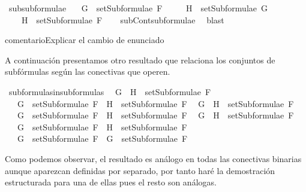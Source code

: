 \begin{isabellebody}
%
\endisadelimproof
\isanewline
{}\isamarkupfalse%
\ subsubformulae{\isacharcolon}\ \isanewline
\ \ {\isachardoublequoteopen}G\ {\isasymin}\ setSubformulae\ F\ \isanewline
\ \ \ {\isasymLongrightarrow}\ H\ {\isasymin}\ setSubformulae\ G\ \isanewline
\ \ \ {\isasymLongrightarrow}\ H\ {\isasymin}\ setSubformulae\ F{\isachardoublequoteclose}\isanewline
%
\isadelimproof
\ \ %
\endisadelimproof
%
\isatagproof
{}\isamarkupfalse%
\ subContsubformulae\ \isamarkupfalse%
\ blast%
\endisatagproof
{\isafoldproof}%
%
\isadelimproof
%
\endisadelimproof
%
\begin{isamarkuptext}%
comentario{Explicar el cambio de enunciado}%
\end{isamarkuptext}\isamarkuptrue%
%
\begin{isamarkuptext}%
A continuación presentamos otro resultado que relaciona los 
  conjuntos de subfórmulas según las conectivas que operen.%
\end{isamarkuptext}\isamarkuptrue%
\isamarkupfalse%
\ subformulas{\isacharunderscore}in{\isacharunderscore}subformulas{\isacharcolon}\isanewline
\ \ {\isachardoublequoteopen}G\ \isactrlbold {\isasymand}\ H\ {\isasymin}\ setSubformulae\ F\ \isanewline
\ \ {\isasymLongrightarrow}\ G\ {\isasymin}\ setSubformulae\ F\ {\isasymand}\ H\ {\isasymin}\ setSubformulae\ F{\isachardoublequoteclose}\isanewline
\ \ {\isachardoublequoteopen}G\ \isactrlbold {\isasymor}\ H\ {\isasymin}\ setSubformulae\ F\ \isanewline
\ \ {\isasymLongrightarrow}\ G\ {\isasymin}\ setSubformulae\ F\ {\isasymand}\ H\ {\isasymin}\ setSubformulae\ F{\isachardoublequoteclose}\isanewline
\ \ {\isachardoublequoteopen}G\ \isactrlbold {\isasymrightarrow}\ H\ {\isasymin}\ setSubformulae\ F\ \isanewline
\ \ {\isasymLongrightarrow}\ G\ {\isasymin}\ setSubformulae\ F\ {\isasymand}\ H\ {\isasymin}\ setSubformulae\ F{\isachardoublequoteclose}\isanewline
\ \ {\isachardoublequoteopen}\isactrlbold {\isasymnot}\ G\ {\isasymin}\ setSubformulae\ F\ {\isasymLongrightarrow}\ G\ {\isasymin}\ setSubformulae\ F{\isachardoublequoteclose}\isanewline
%
\isadelimproof
\ \ %
\endisadelimproof
%
\isatagproof
{}\isamarkupfalse%
%
\endisatagproof
{\isafoldproof}%
%
\isadelimproof
%
\endisadelimproof
%
\begin{isamarkuptext}%
Como podemos observar, el resultado es análogo en todas las 
  conectivas binarias aunque aparezcan definidas por separado, por tanto 
  haré la demostración estructurada para una de ellas pues el resto son 
  análogas. 


\end{isamarkuptext}
\end{isabellebody}
